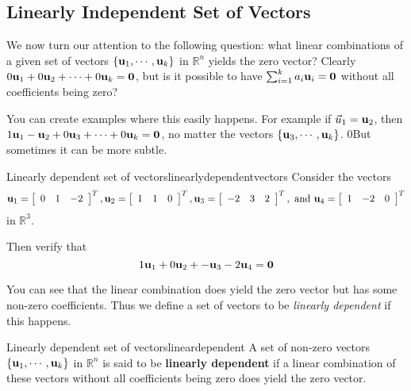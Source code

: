 \subsection{Linearly Independent Set of Vectors}

We now turn our attention to the following question: what linear
combinations of a given set of vectors $\{ {\bf u}_1, \cdots
,{\bf u}_k\}$ in $\mathbb{R}^{n}$ yields the zero vector? Clearly
$0{\bf u}_1 + 0{\bf u}_2+ \cdots + 0 {\bf u}_k = {\bf 0}$, but is
it possible to have $\sum_{i=1}^{k}a_{i}{\bf u}_{i}={\bf 0}$ without
all coefficients being zero?

You can create examples where this easily happens. For example if $\vec{u}_1={\bf u}_2$, then 
$1{\bf u}_1 - {\bf u}_2+ 0 {\bf u}_3 + \cdots  + 0 {\bf u}_k = {\bf 0}$, no matter the vectors 
 $\{ {\bf u}_3, \cdots ,{\bf u}_k\}$. 0But sometimes it can be more subtle. 

\begin{example}{Linearly dependent set of vectors}{linearlydependentvectors}
Consider the vectors 
\begin{equation*}
{\bf u}_1=\left[ 
\begin{array}{rrr}
0  & 1 & -2
\end{array}
\right]^T, 
{\bf u}_2=\left[ 
\begin{array}{rrr}
1  & 1 & 0
\end{array}
\right]^T, 
{\bf u}_3=\left[ 
\begin{array}{rrr}
-2  & 3 & 2
\end{array}
\right]^T, \mbox{ and } 
{\bf u}_4=\left[ 
\begin{array}{rrr}
1  & -2 & 0
\end{array}
\right]^T
\end{equation*}
in $\mathbb{R}^{3}$.

Then verify that 
\begin{equation*}
1{\bf u}_1 +0 {\bf u}_2+ - {\bf u}_3 -2 {\bf u}_4 = {\bf 0}
\end{equation*}
\end{example}

You can see that the linear combination does yield the zero vector but
has some non-zero coefficients. Thus we define a set of vectors to be
{\em linearly dependent} if this happens.

\begin{definition}{Linearly dependent set of vectors}{lineardependent}
A set of non-zero vectors $\{ {\bf u}_1, \cdots ,{\bf u}_k\}$ in $\mathbb{R}^{n}$ is said to be 
\textbf{linearly dependent} if a linear combination of these vectors without all  coefficients being zero does yield the zero vector.
\end{definition}

